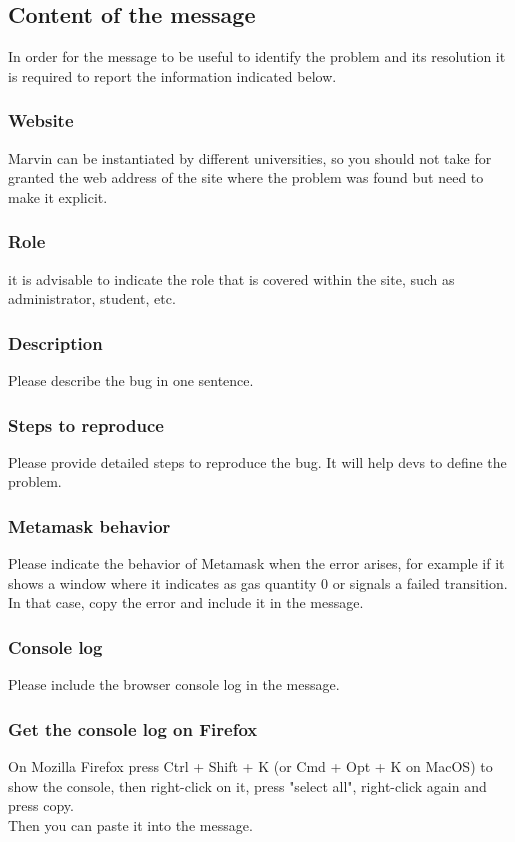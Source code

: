 \documentclass[ManualeUtente]{subfiles}
\begin{document}
\subsection{Content of the message}
In order for the message to be useful to identify the problem and its resolution it is required to report the information indicated below.

\subsubsection{Website}
Marvin can be instantiated by different universities, so you should not take for granted the web address of the site where the problem was found but need to make it explicit.

\subsubsection{Role}
it is advisable to indicate the role that is covered within the site, such as administrator, student, etc.

\subsubsection{Description}
Please describe the bug in one sentence.

\subsubsection{Steps to reproduce}
Please provide detailed steps to reproduce the bug. It will help devs to define the problem.

\subsubsection{Metamask behavior}
Please indicate the behavior of Metamask when the error arises, for example if it shows a window where it indicates as gas quantity 0 or signals a failed transition. In that case, copy the error and include it in the message.

\subsubsection{Console log}
Please include the browser console log in the message.
\subsubsection{Get the console log on Firefox}
On Mozilla Firefox press Ctrl + Shift + K (or Cmd + Opt + K on MacOS) to show the console, then right-click on it, press "select all", right-click again and press copy. \\
Then you can paste it into the message.
\end{document}
